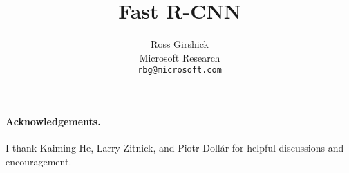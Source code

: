 \documentclass[10pt,twocolumn,letterpaper]{article}
\begin{document}
\title{Fast R-CNN}

\author{Ross Girshick\\
Microsoft Research\\
{\tt\small rbg@microsoft.com}
}

\maketitle
\thispagestyle{empty}








\paragraph{Acknowledgements.}
I thank Kaiming He, Larry Zitnick, and Piotr Doll{\'a}r for helpful discussions and encouragement.

{\small


}
\end{document}
